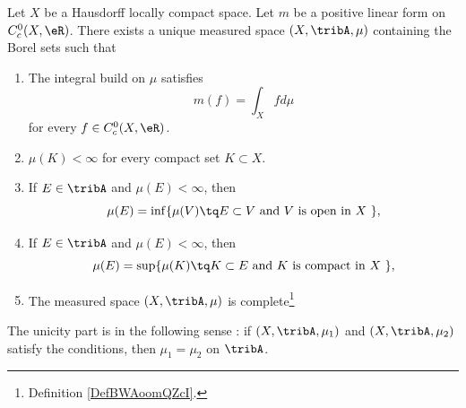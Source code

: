 \begin{theorem}      \label{THOooTWZWooHqGDAx}
	Let \( X\) be a Hausdorff locally compact space. Let \( m\) be a positive linear form on \( C^0_c(X, \eR)\). There exists a unique measured space \( (X,\tribA, \mu)\)  containing the Borel sets such that
	\begin{enumerate}
		\item       \label{ITEMooAKLQooWLetDk}
		      The integral build on \( \mu\) satisfies
		      \begin{equation}
			      m(f)=\int_X fd\mu
		      \end{equation}
		      for every \( f\in C^0_c(X,\eR)\).
		\item       \label{ITEMooFLYHooTNUENu}
		      \( \mu(K)<\infty\) for every compact set \( K\subset X\).
		\item       \label{ITEMooKDTLooJuUTaW}
		      If \( E\in\tribA\) and \( \mu(E)<\infty\), then
		      \begin{equation}
			      \mu(E)=\inf\{ \mu(V)\tq E\subset V \text{ and \( V\) is open in \( X\) }\},
		      \end{equation}
		\item       \label{ITEMooVKDEooXGJYgg}
		      If \( E\in\tribA\) and \( \mu(E)<\infty\), then
		      \begin{equation}
			      \mu(E)=\sup\{ \mu(K)\tq K\subset E \text{ and \( K\) is compact in \( X\) }\},
		      \end{equation}
		\item       \label{ITEMooLOQQooFcHyaM}
		      The measured space \( (X,\tribA,\mu)\) is complete\footnote{Definition \ref{DefBWAoomQZcI}.}
	\end{enumerate}
	The unicity part is in the following sense : if \( (X,\tribA, \mu_1)\) and \( (X,\tribA,\mu_2)\) satisfy the conditions, then \( \mu_1=\mu_2\) on \( \tribA\).
\end{theorem}

